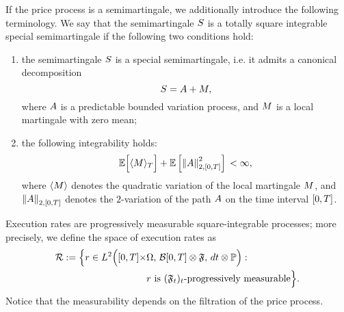 \documentclass[10pt,a4paper]{article}
\begin{document}
	If the price process is a semimartingale, we additionally introduce the following terminology. We say that the semimartingale $\semimartingale$ is a totally square integrable special semimartingale if the following two conditions hold:
	\begin{enumerate}
		\item the semimartingale $\semimartingale$ is a special semimartingale, i.e. it admits a canonical decomposition 
		\begin{equation*}
		\semimartingale=\boundedVariationPart + \martingale,
		\end{equation*}
		where $\boundedVariationPart$ is a predictable bounded variation process, and $\martingale$ is a local martingale with zero mean;
		\item the following integrability holds:
		\begin{equation*}
		\Expectation \Big[ \langle \martingale \rangle_\timeHorizon  \Big] + \Expectation \left[ \norm[\boundedVariationPart]_{2,\timeWindow}\squared  \right] \, < \infty,
		\end{equation*}
		where $\langle \martingale \rangle$ denotes the quadratic variation of the local martingale $\martingale$, and $ \norm[\boundedVariationPart]_{2,\timeWindow}$ denotes the $2$-variation of the path $\boundedVariationPart$ on the time interval $\timeWindow$. 
	\end{enumerate}
	
	 
	 
	Execution rates are progressively measurable square-integrable processes; more precisely, we define the space of execution rates as
	\begin{equation}\label{eq.definitionOfSpaceExecutionRates}
	\begin{split}
	\spaceExecutionRates:= \Big\lbrace
	r \in \Ltwo\Big([0,T]\times& \Omega, \, \mathcal{B}[0,T]\otimes \sigmaAlgebra, \, dt\otimes \Prob\Big): \, \\
	&
	r \text{ is } (\sigmaAlgebra_t)_t\text{-progressively measurable}\Big\rbrace.
	\end{split}
	\end{equation}
	Notice that the measurability depends on the filtration of the price process. 
	
\end{document}
